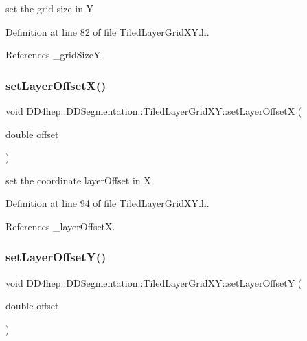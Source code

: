 set the grid size in Y 



Definition at line 82 of file Tiled\+Layer\+Grid\+X\+Y.\+h.



References \+\_\+grid\+SizeY.

\hypertarget{class_d_d4hep_1_1_d_d_segmentation_1_1_tiled_layer_grid_x_y_a4368c4380115aa312e1b127e4b15aed9}{}\label{class_d_d4hep_1_1_d_d_segmentation_1_1_tiled_layer_grid_x_y_a4368c4380115aa312e1b127e4b15aed9} 
\subsubsection{\texorpdfstring{set\+Layer\+Offset\+X()}{setLayerOffsetX()}}
{\footnotesize\ttfamily void D\+D4hep\+::\+D\+D\+Segmentation\+::\+Tiled\+Layer\+Grid\+X\+Y\+::set\+Layer\+OffsetX (\begin{DoxyParamCaption}\item[{double}]{offset }\end{DoxyParamCaption})\hspace{0.3cm}{\ttfamily [inline]}}



set the coordinate layer\+Offset in X 



Definition at line 94 of file Tiled\+Layer\+Grid\+X\+Y.\+h.



References \+\_\+layer\+OffsetX.

\hypertarget{class_d_d4hep_1_1_d_d_segmentation_1_1_tiled_layer_grid_x_y_a280670f55a514e9f6f373bef61832ad0}{}\label{class_d_d4hep_1_1_d_d_segmentation_1_1_tiled_layer_grid_x_y_a280670f55a514e9f6f373bef61832ad0} 
\subsubsection{\texorpdfstring{set\+Layer\+Offset\+Y()}{setLayerOffsetY()}}
{\footnotesize\ttfamily void D\+D4hep\+::\+D\+D\+Segmentation\+::\+Tiled\+Layer\+Grid\+X\+Y\+::set\+Layer\+OffsetY (\begin{DoxyParamCaption}\item[{double}]{offset }\end{DoxyParamCaption})\hspace{0.3cm}{\ttfamily [inline]}}



